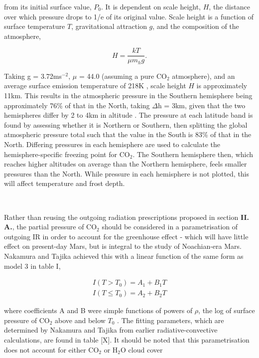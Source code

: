 \documentclass[12pt,onecolumn]{revtex4-2}    %
\begin{document}
from its initial surface value, $P_{0}$. It is dependent on scale height, $H$, the distance over which pressure drops to 1/e of its original value. Scale height is a function of surface temperature $T$, gravitational attraction $g$, and the composition of the atmosphere,

\begin{equation}
H = \frac{kT}{\mu m_{h} g}.
\end{equation}

Taking g = 3.72ms$^{-2}$, $\mu$ = 44.0 (assuming a pure $\mathrm{CO_2}$ atmosphere), and an average surface emission temperature of 218K \cite{M01}, scale height $H$ is approximately 11km. This results in the atmospheric pressure in the Southern hemisphere being approximately 76\% of that in the North, taking  $\Delta$h = 3km, given that the two hemispheres differ by 2 to 4km in altitude \cite{S04}. The pressure at each latitude band is found by assessing whether it is Northern or Southern, then splitting the global atmospheric pressure total such that the value in the South is 83\% of that in the North. Differing pressures in each hemisphere are used to calculate the hemisphere-specific freezing point for $\mathrm{CO_2}$. The Southern hemisphere then, which reaches higher altitudes on average than the Northern hemisphere, feels smaller pressures than the North. While pressure in each hemisphere is not plotted, this will affect temperature and frost depth.

\

Rather than reusing the outgoing radiation prescriptions proposed in section \textbf{II. A.}, the partial pressure of $\mathrm{CO_2}$ should be considered in a parametrisation of outgoing IR in order to account for the greenhouse effect - which will have little effect on present-day Mars, but is integral to the study of Noachian-era Mars. Nakamura and Tajika achieved this with a linear function of the same form as model 3 in table I,

\begin{equation}
\begin{aligned}
I(T>T_{0}) = A_{1} + B_{1}T
\\
I(T \le T_{0}) = A_{2} + B_{2}T
\end{aligned}
\end{equation}

where coefficients A and B were simple functions of powers of $\rho$, the log of surface pressure of $\mathrm{CO_2}$ above and below $T_{0}$ \cite{NT01}. The fitting parameters, which are determined by Nakamura and Tajika from earlier radiative-convective calculations, are found in table [X]. It should be noted that this parametrisation does not account for either $\mathrm{CO_2}$ or $\mathrm{H_2 O}$ cloud cover
\end{document}
